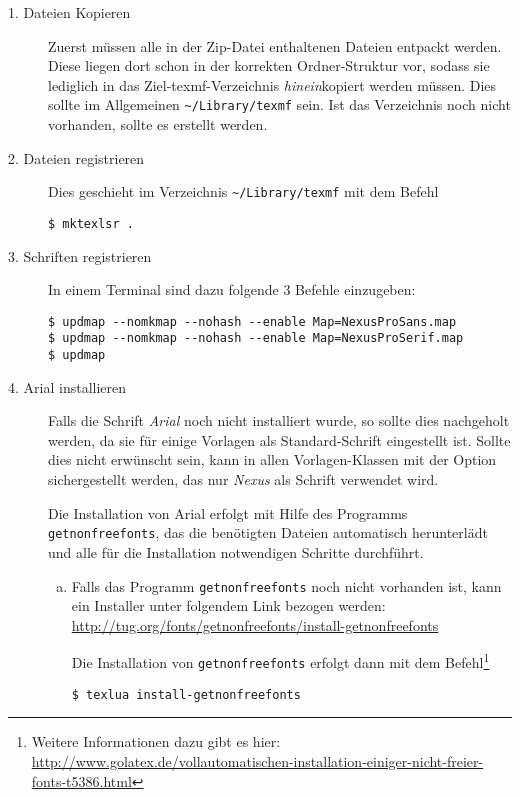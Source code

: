 \begin{description}
  \item[1. Dateien Kopieren] Zuerst müssen alle in der Zip-Datei enthaltenen
    Dateien entpackt werden.
    Diese liegen dort schon in der korrekten Ordner-Struktur vor, sodass
    sie lediglich in das Ziel-texmf-Verzeichnis \emph{hinein}kopiert werden
    müssen.
    Dies sollte im Allgemeinen \lstinline{~/Library/texmf} sein.
    Ist das Verzeichnis noch nicht vorhanden, sollte es erstellt werden.

  \item[2. Dateien registrieren]
    Dies geschieht im Verzeichnis \lstinline{~/Library/texmf} mit dem Befehl
    \begin{lstlisting}[style=cmd]
$ mktexlsr .
    \end{lstlisting}

  \item[3. Schriften registrieren]
    In einem Terminal sind dazu folgende 3 Befehle einzugeben:
    \begin{lstlisting}[style=cmd]
$ updmap --nomkmap --nohash --enable Map=NexusProSans.map
$ updmap --nomkmap --nohash --enable Map=NexusProSerif.map
$ updmap
    \end{lstlisting}


  \item[4. Arial installieren]
    Falls die Schrift \emph{Arial} noch nicht installiert wurde, so sollte dies
    nachgeholt werden, da sie für einige Vorlagen als Standard-Schrift
    eingestellt ist. Sollte dies nicht erwünscht sein, kann in allen
    Vorlagen-Klassen mit der Option  sichergestellt werden,
    das nur \emph{Nexus} als Schrift verwendet wird.
    
    Die Installation von Arial erfolgt mit Hilfe des Programms
    \lstinline{getnonfreefonts}, das die benötigten Dateien automatisch
    herunterlädt und alle für die Installation notwendigen Schritte durchführt.
    \begin{enumerate}[a)]
      \item Falls das Programm \lstinline{getnonfreefonts} noch nicht vorhanden
        ist, kann ein Installer unter folgendem Link bezogen werden:\\
        \url{http://tug.org/fonts/getnonfreefonts/install-getnonfreefonts}
    
        Die Installation von \lstinline{getnonfreefonts} erfolgt dann mit dem
        Befehl\footnote{Weitere Informationen dazu gibt es hier:\\
          \url{http://www.golatex.de/vollautomatischen-installation-einiger-nicht-freier-fonts-t5386.html}}
        \begin{lstlisting}[style=cmd]
$ texlua install-getnonfreefonts
        \end{lstlisting}
        

\end{enumerate}
\end{description}
